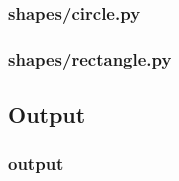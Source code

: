 \documentclass{beamer}
\begin{document}
  \begin{frame}
  \frametitle{shapes/circle.py}
  
  \end{frame}

  \begin{frame}
  \frametitle{shapes/rectangle.py}
  
  \end{frame}

\subsection{Output}
  \begin{frame}
  \frametitle{output}
  
  \end{frame}
\end{document}
